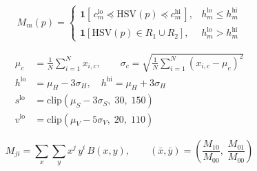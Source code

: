 
\begin{equation}
M_m(p) =
\begin{cases}
\mathbf{1}\!\left[\, c^{\text{lo}}_m \preceq \mathrm{HSV}(p) \preceq c^{\text{hi}}_m \,\right],
  & h^{\text{lo}}_m \le h^{\text{hi}}_m \\[4pt]
\mathbf{1}\!\left[ \mathrm{HSV}(p) \in R_1 \cup R_2 \right],
  & h^{\text{lo}}_m > h^{\text{hi}}_m
\end{cases}
\label{eq:segmentation}
\end{equation}

\begin{align}
\mu_c &= \tfrac{1}{N}\sum_{i=1}^{N} x_{i,c}, \qquad
\sigma_c = \sqrt{\tfrac{1}{N}\sum_{i=1}^{N}(x_{i,c}-\mu_c)^2} \\
h^{\text{lo}} &= \mu_H - 3\sigma_H, \quad h^{\text{hi}} = \mu_H + 3\sigma_H \\
s^{\text{lo}} &= \mathrm{clip}(\mu_S - 3\sigma_S,\; 30,\; 150) \\
v^{\text{lo}} &= \mathrm{clip}(\mu_V - 5\sigma_V,\; 20,\; 110)
\label{eq:calibration}
\end{align}

\begin{equation}
M_{ji} = \sum_{x}\sum_{y} x^{j}\, y^{i}\, B(x,y), \qquad
(\bar{x},\bar{y}) = \left( \frac{M_{10}}{M_{00}},\; \frac{M_{01}}{M_{00}} \right)
\label{eq:centroid}
\end{equation}

